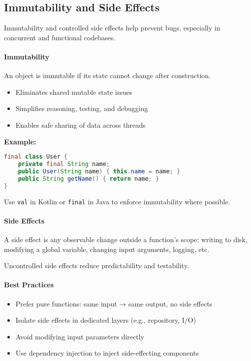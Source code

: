 \documentclass[a4paper,12pt]{article}
\begin{document}
\subsection{Immutability and Side Effects}

Immutability and controlled side effects help prevent bugs, especially in concurrent and functional codebases.

\paragraph{Immutability}
An object is immutable if its state cannot change after construction.

\begin{itemize}
  \item Eliminates shared mutable state issues
  \item Simplifies reasoning, testing, and debugging
  \item Enables safe sharing of data across threads
\end{itemize}

\textbf{Example:}
\begin{lstlisting}[language=Java]
final class User {
    private final String name;
    public User(String name) { this.name = name; }
    public String getName() { return name; }
}
\end{lstlisting}

Use \texttt{val} in Kotlin or \texttt{final} in Java to enforce immutability where possible.

\paragraph{Side Effects}
A side effect is any observable change outside a function’s scope: writing to disk, modifying a global variable, changing input arguments, logging, etc.

Uncontrolled side effects reduce predictability and testability.

\paragraph{Best Practices}
\begin{itemize}
  \item Prefer pure functions: same input → same output, no side effects
  \item Isolate side effects in dedicated layers (e.g., repository, I/O)
  \item Avoid modifying input parameters directly
  \item Use dependency injection to inject side-effecting components
\end{itemize}
\end{document}
